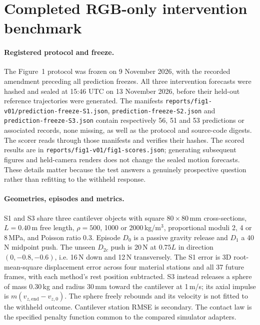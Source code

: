 \section{Completed RGB-only intervention benchmark}
\label{sec:supp-fig1}

\paragraph{Registered protocol and freeze.}
The Figure~1 protocol was frozen on 9 November 2026, with the recorded amendment preceding all prediction freezes. All three intervention forecasts were hashed and sealed at 15:46 UTC on 13 November 2026, before their held-out reference trajectories were generated. The manifests \texttt{reports/fig1-v01/prediction-freeze-S1.json}, \texttt{prediction-freeze-S2.json} and \texttt{prediction-freeze-S3.json} contain respectively 56, 51 and 53 predictions or associated records, none missing, as well as the protocol and source-code digests. The scorer reads through those manifests and verifies their hashes. The scored results are in \texttt{reports/fig1-v01/fig1-scores.json}; generating subsequent figures and held-camera renders does not change the sealed motion forecasts. These details matter because the test answers a genuinely prospective question rather than refitting to the withheld response.

\paragraph{Geometries, episodes and metrics.}
S1 and S3 share three cantilever objects with square $80\times80$\,mm cross-sections, $L=0.40$\,m free length, $\rho=500$, 1000 or 2000\,kg/m$^3$, proportional moduli 2, 4 or 8\,MPa, and Poisson ratio 0.3. Episode $D_0$ is a passive gravity release and $D_1$ a 40\,N midpoint push. The unseen $D_{2c}$ push is 20\,N at $0.75L$ in direction $(0,-0.8,-0.6)$, i.e. 16\,N down and 12\,N transversely. The S1 error is 3D root-mean-square displacement error across four material stations and all 37 future frames, with each method's rest position subtracted. S3 instead releases a sphere of mass 0.30\,kg and radius 30\,mm toward the cantilever at 1\,m/s; its axial impulse is $m(v_{z,\mathrm{end}}-v_{z,0})$. The sphere freely rebounds and its velocity is not fitted to the withheld outcome. Cantilever station RMSE is secondary. The contact law is the specified penalty function common to the compared simulator adapters.

